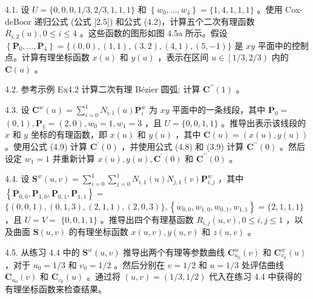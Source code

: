 \documentclass[../main.tex]{subfiles}
\begin{document}
4.1. 设 \(U = \{ 0,0,0,1/3,2/3,1,1,1\}\) 和 \(\left\{  {{w}_{0},\ldots ,{w}_{4}}\right\}   = \{ 1,4,1,1,1\}\) 。使用 Cox-deBoor 递归公式 (公式 [2.5]) 和公式 (4.2)，计算五个二次有理函数 \({R}_{i,2}\left( u\right) ,0 \leq  i \leq  4\) 。这些函数的图形如图 4.5a 所示。假设 \(\left\{  {{\mathbf{P}}_{0},\ldots ,{\mathbf{P}}_{4}}\right\}   = \{ \left( {0,0}\right) ,\left( {1,1}\right) ,\left( {3,2}\right) ,\left( {4,1}\right) ,\left( {5, - 1}\right) \}\) 是 \({xy}\) 平面中的控制点。计算有理坐标函数 \(x\left( u\right)\) 和 \(y\left( u\right)\) ，表示在区间 \(u \in  \left\lbrack  {1/3,2/3}\right)\) 内的 \(\mathbf{C}\left( u\right)\) 。

4.2. 参考示例 Ex4.2 计算二次有理 Bézier 圆弧; 计算 \({\mathbf{C}}^{\prime \prime }\left( 1\right)\) 。

4.3. 设 \({\mathbf{C}}^{w}\left( u\right)  = \mathop{\sum }\limits_{{i = 0}}^{1}{N}_{i,1}\left( u\right) {\mathbf{P}}_{i}^{w}\) 为 \({xy}\) 平面中的一条线段，其中 \({\mathbf{P}}_{0} =\)  \(\left( {0,1}\right) ,{\mathbf{P}}_{1} = \left( {2,0}\right) ,{w}_{0} = 1,{w}_{1} = 3\) ，且 \(U = \{ 0,0,1,1\}\) 。推导出表示该线段的 \(x\) 和 \(y\) 坐标的有理函数，即 \(x\left( u\right)\) 和 \(y\left( u\right)\) ，其中 \(\mathbf{C}\left( u\right)  = \left( {x\left( u\right) ,y\left( u\right) }\right)\) 。使用公式 (4.9) 计算 \({\mathbf{C}}^{\prime }\left( 0\right)\) ，并使用公式 (4.8) 和 (3.9) 计算 \({\mathbf{C}}^{\prime \prime }\left( 0\right)\) 。然后设定 \({w}_{1} = 1\) 并重新计算 \(x\left( u\right) ,y\left( u\right) ,{\mathbf{C}}^{\prime }\left( 0\right)\) 和 \({\mathbf{C}}^{\prime \prime }\left( 0\right)\) 。

4.4. 设 \({\mathbf{S}}^{w}\left( {u,v}\right)  = \mathop{\sum }\limits_{{i = 0}}^{1}\mathop{\sum }\limits_{{j = 0}}^{1}{N}_{i,1}\left( u\right) {N}_{j,1}\left( v\right) {\mathbf{P}}_{i,j}^{w}\) ，其中 \(\left\{  {{\mathbf{P}}_{0,0},{\mathbf{P}}_{1,0},{\mathbf{P}}_{0,1},{\mathbf{P}}_{1,1}}\right\}   =\)  \(\{ \left( {0,0,1}\right) ,\left( {0,1,3}\right) ,\left( {2,1,1}\right) ,\left( {2,0,3}\right) \} ,\left\{  {{w}_{0,0},{w}_{1,0},{w}_{0,1},{w}_{1,1}}\right\}   = \{ 2,1,1,1\}\) ，且 \(U = V =\)  \(\{ 0,0,1,1\}\) 。推导出四个有理基函数 \({R}_{i,j}\left( {u,v}\right) ,0 \leq  i,j \leq  1\) ，以及曲面 \(\mathbf{S}\left( {u,v}\right)\) 的有理坐标函数 \(x\left( {u,v}\right) ,y\left( {u,v}\right)\) 和 \(z\left( {u,v}\right)\) 。

4.5. 从练习 4.4 中的 \({\mathbf{S}}^{w}\left( {u,v}\right)\) 推导出两个有理等参数曲线 \({\mathbf{C}}_{{u}_{0}}^{w}\left( v\right)\) 和 \({\mathbf{C}}_{{v}_{0}}^{w}\left( u\right)\) ，对于 \({u}_{0} = 1/3\) 和 \({v}_{0} = 1/2\) 。然后分别在 \(v = 1/2\) 和 \(u = 1/3\) 处评估曲线 \({\mathbf{C}}_{{u}_{0}}\left( v\right)\) 和 \({\mathbf{C}}_{{v}_{0}}\left( u\right)\) 。通过将 \(\left( {u,v}\right)  = \left( {1/3,1/2}\right)\) 代入在练习 4.4 中获得的有理坐标函数来检查结果。
\end{document}
